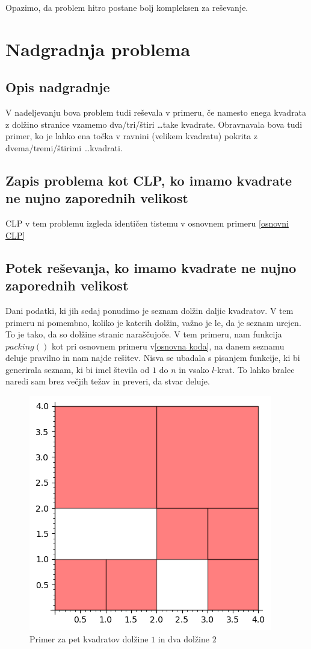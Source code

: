 \documentclass[a4paper, 11pt]{article}
\begin{document}
\noindent Opazimo, da problem hitro postane bolj kompleksen za reševanje.

\section{Nadgradnja problema}
\subsection{Opis nadgradnje}
V nadeljevanju bova problem tudi reševala v primeru, 
če namesto enega kvadrata z dolžino 
stranice vzamemo dva/tri/štiri \dots take kvadrate. 
Obravnavala bova tudi primer, ko je lahko ena točka v ravnini (velikem kvadratu) pokrita z 
dvema/tremi/štirimi \dots  kvadrati.
\subsection{Zapis problema kot CLP, ko imamo kvadrate ne nujno zaporednih velikost}
CLP v tem problemu izgleda identičen tistemu v osnovnem primeru \ref{osnovni CLP}

\subsection{Potek reševanja, ko imamo kvadrate ne nujno zaporednih velikost}
Dani podatki, ki jih sedaj ponudimo je seznam dolžin daljic kvadratov. V tem primeru ni 
pomembno, koliko je katerih dolžin, važno je le, da je seznam urejen. To je tako,
da so dolžine stranic naraščujoče.
V tem primeru, nam funkcija $packing()$ kot pri osnovnem primeru v\ref{osnovna koda}, na danem seznamu deluje pravilno in nam najde rešitev.
Nisva se ubadala s pisanjem funkcije, ki bi generirala seznam, ki bi imel števila od 
$1$ do $n$ in vsako $l$-krat. To lahko bralec naredi sam brez večjih težav in preveri, da 
stvar deluje.

\begin{figure}[H]
    \centering
    \includegraphics{Vec_istih_kvadratov.png}
    \caption{Primer za pet kvadratov dolžine $1$ in dva dolžine $2$}
\end{figure}
\end{document}
